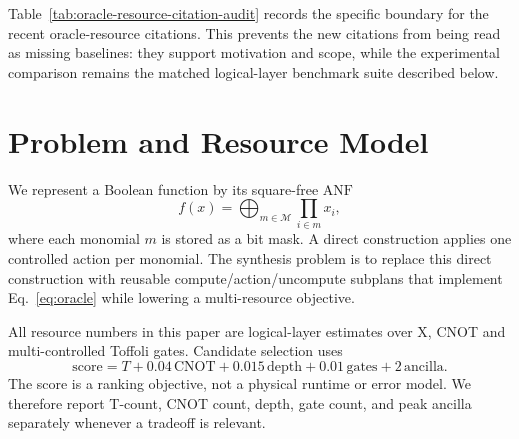 \documentclass[11pt]{article}
\newcommand{\anf}{\ensuremath{\mathrm{ANF}}}
\newcommand{\fprm}{\ensuremath{\mathrm{FPRM}}}
\newcommand{\mcts}{\ensuremath{\mathrm{MCTS}}}
\newcommand{\score}{\ensuremath{\mathrm{score}}}
\begin{document}
\begin{table}[H]
\centering
\scriptsize
\setlength{\tabcolsep}{2pt}
\renewcommand{\arraystretch}{1.05}
\caption{Related-work positioning matrix.  The table states what each
literature family optimizes, which gap motivates the proposed search, and how
the manuscript uses that family in experiments or claim boundaries.}
\label{tab:related-positioning}

\end{table}

Table~\ref{tab:oracle-resource-citation-audit} records the specific boundary
for the recent oracle-resource citations.  This prevents the new citations
from being read as missing baselines: they support motivation and scope, while
the experimental comparison remains the matched logical-layer benchmark suite
described below.

\begin{table}[H]
\centering
\scriptsize
\setlength{\tabcolsep}{3pt}
\renewcommand{\arraystretch}{1.04}
\caption{Recent oracle-resource citation audit.  Each row records what the
adjacent paper verifies and why it is not treated as a direct experimental
baseline for neural \mcts{} \anf{}/\fprm{} term search.}
\label{tab:oracle-resource-citation-audit}

\end{table}

\section{Problem and Resource Model}

We represent a Boolean function by its square-free \anf{}
\begin{equation}
  f(x)=\bigoplus_{m\in\mathcal{M}}\prod_{i\in m}x_i ,
  \label{eq:anf}
\end{equation}
where each monomial $m$ is stored as a bit mask.  A direct construction applies
one controlled action per monomial.  The synthesis problem is to replace this
direct construction with reusable compute/action/uncompute subplans that
implement Eq.~\eqref{eq:oracle} while lowering a multi-resource objective.

All resource numbers in this paper are logical-layer estimates over X, CNOT
and multi-controlled Toffoli gates.  Candidate selection uses
\begin{equation}
  \score =
  T + 0.04\,\mathrm{CNOT} + 0.015\,\mathrm{depth}
  + 0.01\,\mathrm{gates} + 2\,\mathrm{ancilla}.
  \label{eq:score}
\end{equation}
The score is a ranking objective, not a physical runtime or error model.  We
therefore report T-count, CNOT count, depth, gate count, and peak ancilla
separately whenever a tradeoff is relevant.
\end{document}
